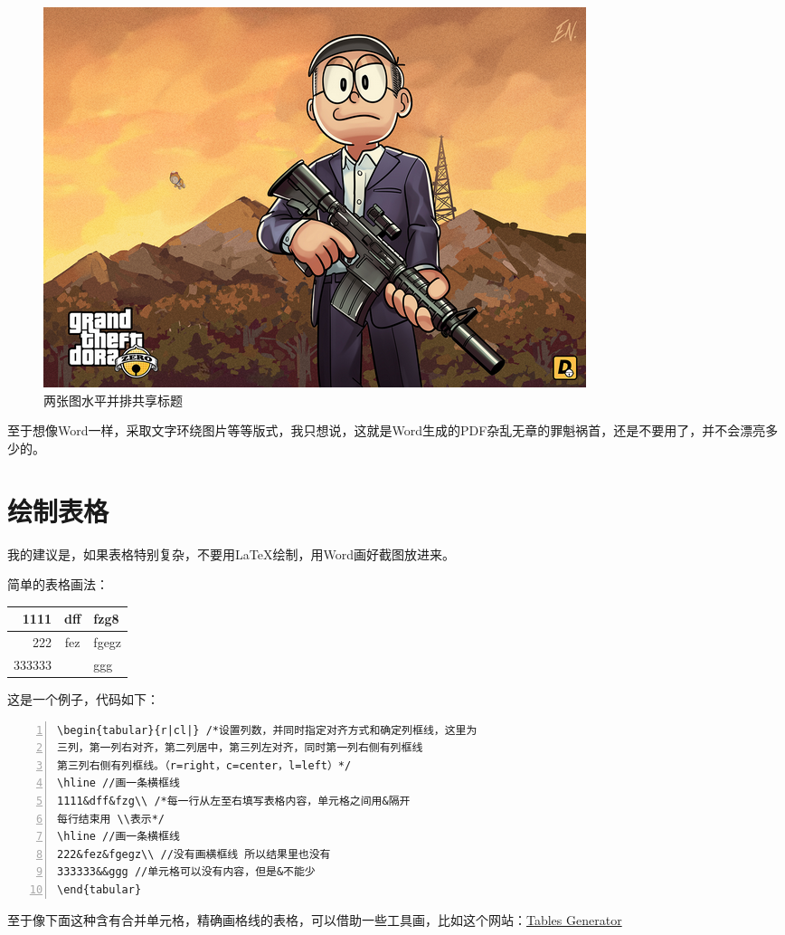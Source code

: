 \documentclass[12pt,a4paper,oneside]{book}
\begin{document}
{\begin{figure}[h]
\includegraphics[scale=0.21]{Figures/xf.png}
\caption{两张图水平并排共享标题}
\label{pic:dora}
\end{figure}
\par
至于想像Word一样，采取文字环绕图片等等版式，我只想说，这就是Word生成的PDF杂乱无章的罪魁祸首，还是不要用了，并不会漂亮多少的。
\vspace{2em}
\section{绘制表格}
我的建议是，如果表格特别复杂，不要用\LaTeX 绘制，用Word画好截图放进来。
\par
简单的表格画法：
\par
\begin{center}
\begin{tabular}{r|cl|}
\hline
1111&dff&fzg8\\
\hline
222&fez&fgegz\\
333333&&ggg\\
\end{tabular}
\end{center}

\par
这是一个例子，代码如下：

\par

\begin{lstlisting}[language={[ANSI]C}, numbers=left, numberstyle=\tiny, keywordstyle=\color{blue!70},  frame=shadowbox, rulesepcolor=\color{red!20!green!20!blue!20}]
\begin{tabular}{r|cl|} /*设置列数，并同时指定对齐方式和确定列框线，这里为
三列，第一列右对齐，第二列居中，第三列左对齐，同时第一列右侧有列框线
第三列右侧有列框线。（r=right，c=center，l=left）*/
\hline //画一条横框线
1111&dff&fzg\\ /*每一行从左至右填写表格内容，单元格之间用&隔开
每行结束用 \\表示*/
\hline //画一条横框线
222&fez&fgegz\\ //没有画横框线 所以结果里也没有
333333&&ggg //单元格可以没有内容，但是&不能少
\end{tabular}
\end{lstlisting}
\par
至于像下面这种含有合并单元格，精确画格线的表格，可以借助一些工具画，比如这个网站：\href{http://www.tablesgenerator.com/}{Tables Generator}

}
\end{document}
